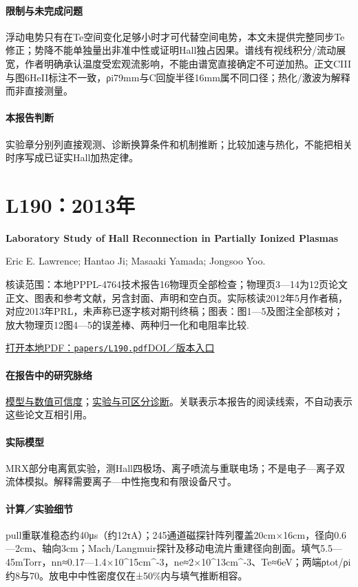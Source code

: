 \paragraph{限制与未完成问题}浮动电势只有在Te空间变化足够小时才可代替空间电势，本文未提供完整同步Te修正；势降不能单独量出非准中性或证明Hall独占因果。谱线有视线积分/流动展宽，作者明确承认温度受宏观流影响，不能由谱宽直接确定不可逆加热。正文CIII与图6HeII标注不一致，ρi79mm与C回旋半径16mm属不同口径；热化/激波为解释而非直接测量。

\paragraph{本报告判断}实验章分别列直接观测、诊断换算条件和机制推断；比较加速与热化，不能把相关时序写成已证实Hall加热定律。

\section{L190：2013年}\label{paper:L190}

\textbf{Laboratory Study of Hall Reconnection in Partially Ionized Plasmas}\citep{L190}\

Eric E. Lawrence;  Hantao Ji;  Masaaki Yamada;  Jongsoo Yoo.

\textsf{核读范围：}本地PPPL-4764技术报告16物理页全部检查；物理页3—14为12页论文正文、图表和参考文献，另含封面、声明和空白页。实际核读2012年5月作者稿，对应2013年PRL，未声称已逐字核对期刊终稿；\textsf{图表：}图1—5及图注全部核对；放大物理页12图4—5的误差棒、两种归一化和电阻率比较.

\href{run:papers/L190.pdf}{打开本地PDF：\texttt{papers/L190.pdf}}\quad\href{https://doi.org/10.1103/physrevlett.110.015001}{DOI／版本入口}

\paragraph{在报告中的研究脉络}\hyperref[ch:numerics]{模型与数值可信度}；\hyperref[story:diagnostic]{实验与可区分诊断}。关联表示本报告的阅读线索，不自动表示这些论文互相引用。

\paragraph{实际模型}MRX部分电离氦实验，测Hall四极场、离子喷流与重联电场；不是电子—离子双流体模拟。解释需要离子—中性拖曳和有限设备尺寸。

\paragraph{计算／实验细节}pull重联准稳态约40μs（约12τA）；245通道磁探针阵列覆盖20cm×16cm，径向0.6—2cm、轴向3cm；Mach/Langmuir探针及移动电流片重建径向剖面。填气5.5—45mTorr，nn≈0.17—1.4×10\textasciicircum{}15cm\textasciicircum{}-3，ne≈2×10\textasciicircum{}13cm\textasciicircum{}-3、Te≈6eV；两端ρtot/ρi约8与70。放电中中性密度仅在±50\%内与填气推断相容。

